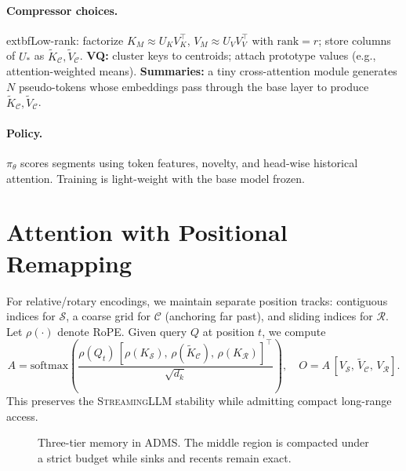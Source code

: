 \documentclass[11pt]{article}
\newcommand{\model}{\textsc{ADMS}} %
\newcommand{\streaming}{\textsc{StreamingLLM}}
\newcommand{\kv}{KV}
\newcommand{\sink}{\mathcal{S}}
\newcommand{\recent}{\mathcal{R}}
\newcommand{\compressed}{\mathcal{C}}
\begin{document}
\paragraph{Compressor choices.}
	extbf{Low-rank:} factorize $K_M \approx U_K V_K^\top$, $V_M \approx U_V V_V^\top$ with $\mathrm{rank}=r$; store columns of $U_*$ as $\tilde K_{\compressed}, \tilde V_{\compressed}$. \textbf{VQ:} cluster keys to centroids; attach prototype values (e.g., attention-weighted means). \textbf{Summaries:} a tiny cross-attention module generates $N$ pseudo-tokens whose embeddings pass through the base layer to produce $\tilde K_{\compressed}, \tilde V_{\compressed}$.

\paragraph{Policy.}
$\pi_\theta$ scores segments using token features, novelty, and head-wise historical attention. Training is light-weight with the base model frozen.

\section{Attention with Positional Remapping}
For relative/rotary encodings, we maintain separate position tracks: contiguous indices for $\sink$, a coarse grid for $\compressed$ (anchoring far past), and sliding indices for $\recent$. Let $\rho(\cdot)$ denote RoPE. Given query $Q$ at position $t$, we compute
\[
  A = \mathrm{softmax}\!\left(\frac{\rho(Q_t)\,[\rho(K_{\sink}),\,\rho(\tilde K_{\compressed}),\,\rho(K_{\recent})]^\top}{\sqrt{d_k}}\right),
\quad
  O = A \,[V_{\sink},\,\tilde V_{\compressed},\,V_{\recent}].
\]
This preserves the \streaming{} stability while admitting compact long-range access.

\begin{figure}[t]
\centering
{}
\caption{Three-tier memory in \model{}. The middle region is compacted under a strict budget while sinks and recents remain exact.}
\end{figure}
\end{document}

